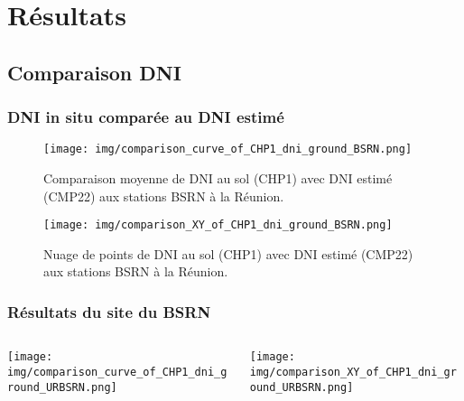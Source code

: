 \documentclass[8pt]{beamer}
\begin{document}
\section{Résultats}
\subsection{Comparaison DNI}

\begin{frame}
	\frametitle{DNI in situ comparée au DNI estimé}
	\begin{figure}[c]
		\centering
		\begin{minipage}[b]{0.49\textwidth}
			\centering
			\texttt{[image: img/comparison\_curve\_of\_CHP1\_dni\_ground\_BSRN.png]}
			\caption{\centering Comparaison moyenne de DNI au sol (CHP1) avec DNI estimé (CMP22) aux stations BSRN à la Réunion.}
			\label{comparison_curve_of_CHP1_dni_ground_BSRN}
		\end{minipage}\hfill
		\begin{minipage}[b]{0.49\textwidth}
			\centering
			\texttt{[image: img/comparison\_XY\_of\_CHP1\_dni\_ground\_BSRN.png]}
			\caption{\centering Nuage de points de DNI au sol (CHP1) avec  DNI estimé (CMP22) aux stations BSRN à la Réunion.}
			\label{comparison_XY_of_CHP1_dni_ground_BSRN}
		\end{minipage}
	\end{figure}
\end{frame}



\begin{frame}
	\frametitle{Résultats du site du BSRN}
	\begin{columns}[T] %
		\begin{column}{0.49\linewidth} %
			\centering
			\texttt{[image: img/comparison\_curve\_of\_CHP1\_dni\_ground\_URBSRN.png]}
		\end{column}
		\begin{column}{0.49\linewidth} %
			\centering
			\texttt{[image: img/comparison\_XY\_of\_CHP1\_dni\_ground\_URBSRN.png]}
		\end{column}
	\end{columns}
\end{frame}
\end{document}

